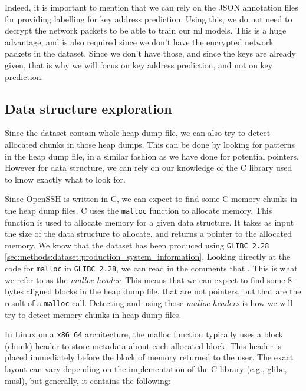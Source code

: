     Indeed, it is important to mention that we can rely on the JSON annotation files for providing labelling for key address prediction. Using this, we do not need to decrypt the network packets to be able to train our \acrshort{ml} models. This is a huge advantage, and is also required since we don't have the encrypted network packets in the dataset. Since we don't have those, and since the keys are already given, that is why we will focus on key address prediction, and not on key prediction.

    \subsection{Data structure exploration}
    Since the dataset contain whole heap dump file, we can also try to detect allocated chunks in those heap dumps. This can be done by looking for patterns in the heap dump file, in a similar fashion as we have done for potential pointers. However for data structure, we can rely on our knowledge of the C library used to know exactly what to look for.
    
    Since OpenSSH is written in C, we can expect to find some C memory chunks in the heap dump files. C uses the \lstinline[language=c]|malloc| function to allocate memory. This function is used to allocate memory for a given data structure. It takes as input the size of the data structure to allocate, and returns a pointer to the allocated memory. We know that the dataset has been produced using \texttt{GLIBC 2.28} \ref{sec:methods:dataset:production_system_information}. Looking directly at the code for \lstinline[language=c]|malloc| in \texttt{GLIBC 2.28}, we can read in the comments that  \cite{MallocGLIBC2001}. This is what we refer to as the \textit{malloc header}. This means that we can expect to find some 8-bytes aligned blocks in the heap dump file, that are not pointers, but that are the result of a \lstinline[language=c]|malloc| call. Detecting and using those \textit{malloc headers} is how we will try to detect memory chunks in heap dump files.

    In Linux on a \texttt{x86\_64} architecture, the malloc function typically uses a block (chunk) header to store metadata about each allocated block. This header is placed immediately before the block of memory returned to the user. The exact layout can vary depending on the implementation of the C library (e.g., glibc, musl), but generally, it contains the following:

